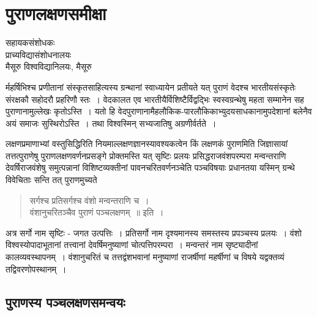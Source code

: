 {\fontsize{15}{17}\selectfont
\presetvalues
\chapter{पुराणलक्षणसमीक्षा}

\begin{center}
\smallskip

सहायकसंशोधकः\\
प्राच्यविद्यासंशोधनालयः\\
मैसूरु विश्वविद्यानिलयः, मैसूरु
\addrule
\end{center}

र्महर्षिभिश्च प्रणीतानां संस्कृतसाहित्यस्य ग्रन्थानां स्वाध्यायेन प्रतीयते यत् पुराणं वेदश्च भारतीयसंस्कृतेः संरक्षकौ सहोदरौ प्रहरिणौ स्तः~। वेदकालत एव भारतीयैर्विशिष्टैर्विद्वद्भिः स्वस्वग्रन्थेषु महता सम्मानेन सह पुराणानामुल्लेखः कृतोऽस्ति~। यतो हि वेदपुराणानामैहलौकिक-पारलौकिकाभ्युदयसाधकानामुपदेशानां बलेनैव अयं समाजः सुस्थिरोऽस्ति~। तथा विश्वस्मिन् सभ्यजातिषु अग्रणीर्वर्तते~। 

लक्षणप्रमाणाभ्यां वस्तुसिद्धिरिति नियमाल्लक्षणज्ञानस्यावश्यकत्वेन किं लक्षणकं पुराणमिति जिज्ञासायां तत्तत्पुराणेषु पुराणलक्षणवर्णनप्रसङ्गे प्रोक्तमस्ति यत् सृष्टिः प्रलयः प्रसिद्धराजवंशपरम्परा मन्वन्तराणि देवर्षिराजवंशेषु समुत्पन्नानां विशिष्टव्यक्तीनां पावनचरितवर्णनञ्चेति पञ्चविषयाः प्रधानतया यस्मिन् ग्रन्थे विवेचिताः सन्ति तत् पुराणमुच्यते 
\begin{verse}
सर्गश्च प्रतिसर्गश्च वंशो मन्वन्तराणि च~। \\
वंशानुचरितञ्चैव पुराणं पञ्चलक्षणम्~॥ इति~। 
\end{verse}
अत्र सर्गो नाम सृष्टिः - जगत उत्पत्तिः~। प्रतिसर्गो नाम दृश्यमानस्य समस्तस्य प्रपञ्चस्य प्रलयः~। वंशो विश्वस्योपादाभूतानां तत्त्वानां देवर्षिमनुष्याणां चोत्पत्तिपरम्परा~। मन्वन्तरं नाम सृष्ट्यादीनां कालव्यवस्थापनम्~। वंशानुचरितं च तत्तद्वंशभवानां मनुष्याणां राजर्षीणां महर्षीणां च विषये यद्वक्तव्यं तद्विवरणोपस्थानम्~। 

\section*{पुराणस्य पञ्चलक्षणसमन्वयः}

}
